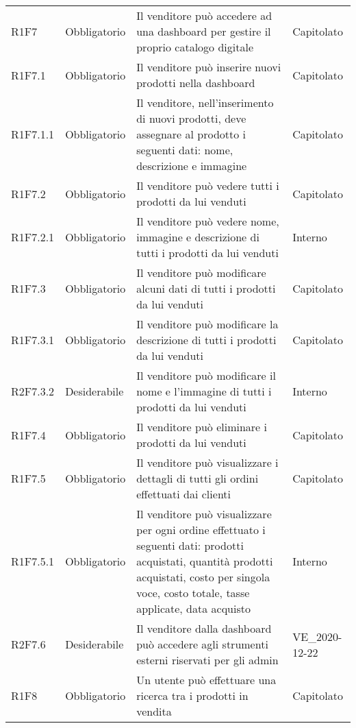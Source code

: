 {\begin{longtable}{C{2.5cm} C{2.8cm} C{6.7cm} C{2.5cm}}
R1F7 & Obbligatorio & Il venditore può accedere ad una dashboard per gestire il proprio catalogo digitale & Capitolato \\
R1F7.1 & Obbligatorio & Il venditore può inserire nuovi prodotti nella dashboard & Capitolato \\
R1F7.1.1 & Obbligatorio & Il venditore, nell'inserimento di nuovi prodotti, deve assegnare al prodotto i seguenti dati: nome, descrizione e immagine & Capitolato \\
R1F7.2 & Obbligatorio & Il venditore può vedere tutti i prodotti da lui venduti & Capitolato \\
R1F7.2.1 & Obbligatorio & Il venditore può vedere nome, immagine e descrizione di tutti i prodotti da lui venduti & Interno \\
R1F7.3 & Obbligatorio & Il venditore può modificare alcuni dati di tutti i prodotti da lui venduti & Capitolato \\
R1F7.3.1 & Obbligatorio & Il venditore può modificare la descrizione di tutti i prodotti da lui venduti & Capitolato \\
R2F7.3.2 & Desiderabile & Il venditore può modificare il nome e l'immagine di tutti i prodotti da lui venduti & Interno \\
R1F7.4 & Obbligatorio & Il venditore può eliminare i prodotti da lui venduti & Capitolato \\
R1F7.5 & Obbligatorio & Il venditore può visualizzare i dettagli di tutti gli ordini effettuati dai clienti & Capitolato \\
R1F7.5.1 & Obbligatorio & Il venditore può visualizzare per ogni ordine effettuato i seguenti dati: prodotti acquistati, quantità prodotti acquistati, costo per singola voce, costo totale, tasse applicate, data acquisto & Interno \\
R2F7.6 & Desiderabile & Il venditore dalla dashboard può accedere agli strumenti esterni riservati per gli admin & VE\_2020-12-22 \\


R1F8 & Obbligatorio & Un utente può effettuare una ricerca tra i prodotti in vendita & Capitolato \\



\end{longtable}}
